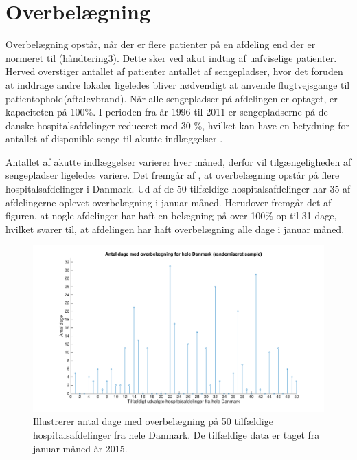 \section{Overbelægning}\label{sec:overbelaegning}

Overbelægning opstår, når der er flere patienter på en afdeling end der er normeret til (håndtering3). Dette sker ved akut indtag af uafviselige patienter. Herved overstiger antallet af patienter antallet af sengepladser, hvor det foruden at inddrage andre lokaler ligeledes bliver nødvendigt at anvende flugtvejsgange til patientophold(aftalevbrand). Når alle sengepladser på afdelingen er optaget, er kapaciteten på 100\%. I perioden fra år 1996 til 2011 er sengepladserne på de danske hospitalsafdelinger reduceret med 30 \%, hvilket kan have en betydning for antallet af disponible senge til akutte indlæggelser \cite{Madsen2014}. 

Antallet af akutte indlæggelser varierer hver måned, derfor vil tilgængeligheden af sengepladser ligeledes variere. Det fremgår af , at overbelægning opstår på flere hospitalsafdelinger i Danmark. Ud af de 50 tilfældige hospitalsafdelinger har 35 af afdelingerne oplevet overbelægning i januar måned. Herudover fremgår det af figuren, at nogle afdelinger har haft en belægning på over 100\% op til 31 dage, hvilket svarer til, at afdelingen har haft overbelægning alle dage i januar måned. 

\begin{figure}[H]
\centering
\includegraphics[width=1\textwidth]{figures/overbelaegning_ran}
\caption{Illustrerer antal dage med overbelægning på 50 tilfældige hospitalsafdelinger fra hele Danmark. De tilfældige data er taget fra januar måned år 2015. \cite{SDS2015}} 
\label{fig:overbelaegning_ran}
\end{figure}


